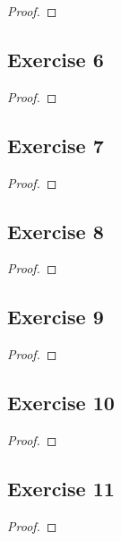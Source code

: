 \documentclass[14pt]{extarticle}
\begin{document}
\begin{proof}

\end{proof}

\subsection{Exercise 6}

\begin{proof}

\end{proof}

\subsection{Exercise 7}

\begin{proof}

\end{proof}

\subsection{Exercise 8}

\begin{proof}

\end{proof}

\subsection{Exercise 9}

\begin{proof}

\end{proof}

\subsection{Exercise 10}

\begin{proof}

\end{proof}

\subsection{Exercise 11}

\begin{proof}

\end{proof}
\end{document}
